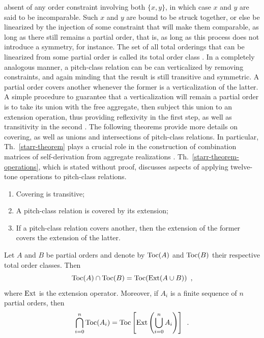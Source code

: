 absent of any order constraint involving both $\{ x, y \}$, in which case $x$ and $y$ are said to be incomparable. Such $x$ and $y$ are bound to be struck together, or else be linearized by the injection of some constraint that will make them comparable, as long as there still remains a partial order, that is, as long as this process does not introduce a symmetry, for instance. The set of all total orderings that can be linearized from some partial order is called its total order class \cite[188]{Starr1984}. In a completely analogous manner, a pitch-class relation can be can verticalized by removing constraints, and again minding that the result is still transitive and symmetric. A partial order covers another whenever the former is a verticalization of the latter. A simple procedure to guarantee that a verticalization will remain a partial order is to take its union with the free aggregate, then subject this union to an extension operation, thus providing reflexivity in the first step, as well as transitivity in the second \cite[192, 193]{Starr1984}. The following theorems provide more details on covering, as well as unions and intersections of pitch-class relations. In particular, Th.~\ref{starr-theorem} plays a crucial role in the construction of combination matrices of self-derivation from aggregate realizations \cite[222]{Starr1984}. Th.~\ref{starr-theorem-operations}, which is stated without proof, discusses aspects of applying twelve-tone operations to pitch-class relations.

\begin{theorem}
    \cite[193]{Starr1984}
    \begin{enumerate}
        \item Covering is transitive;
        \item A pitch-class relation is covered by its extension;
        \item If a pitch-class relation covers another, then the extension of the former covers the extension of the latter.
    \end{enumerate}
\end{theorem}

\begin{theorem}
    \cite[194]{Starr1984}
    \label{starr-theorem}
    Let $A$ and $B$ be partial orders and denote by $\operatorname{Toc}(A)$ and $\operatorname{Toc}(B)$ their respective total order classes. Then
    \begin{equation}
        \operatorname{Toc}(A) \cap \operatorname{Toc}(B) = \operatorname{Toc}(\operatorname{Ext}(A \cup B)) \enspace,
    \end{equation}
    where $\operatorname{Ext}$ is the extension operator. Moreover, if $A_i$ is a finite sequence of $n$ partial orders, then
    \begin{equation}
        \bigcap_{i = 0}^{n} \operatorname{Toc}(A_i) = \operatorname{Toc} \left[ \operatorname{Ext}\left ( \bigcup_{i = 0}^{n} A_i \right) \right] \enspace.
    \end{equation}
\end{theorem}

